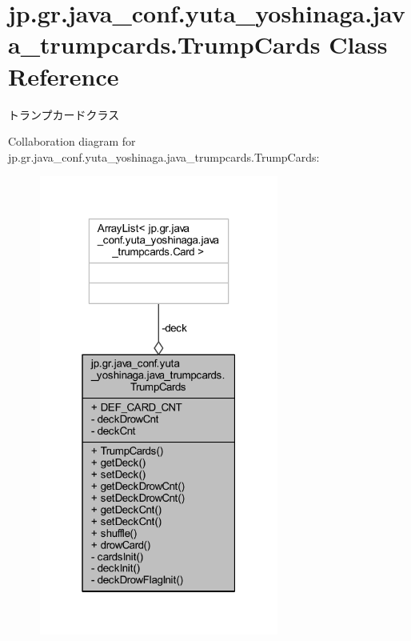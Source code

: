 \hypertarget{classjp_1_1gr_1_1java__conf_1_1yuta__yoshinaga_1_1java__trumpcards_1_1_trump_cards}{}\section{jp.\+gr.\+java\+\_\+conf.\+yuta\+\_\+yoshinaga.\+java\+\_\+trumpcards.\+Trump\+Cards Class Reference}
\label{classjp_1_1gr_1_1java__conf_1_1yuta__yoshinaga_1_1java__trumpcards_1_1_trump_cards}


トランプカードクラス  




Collaboration diagram for jp.\+gr.\+java\+\_\+conf.\+yuta\+\_\+yoshinaga.\+java\+\_\+trumpcards.\+Trump\+Cards\+:
\nopagebreak
\begin{figure}[H]
\begin{center}
\leavevmode
\includegraphics[width=223pt]{classjp_1_1gr_1_1java__conf_1_1yuta__yoshinaga_1_1java__trumpcards_1_1_trump_cards__coll__graph}
\end{center}
\end{figure}
